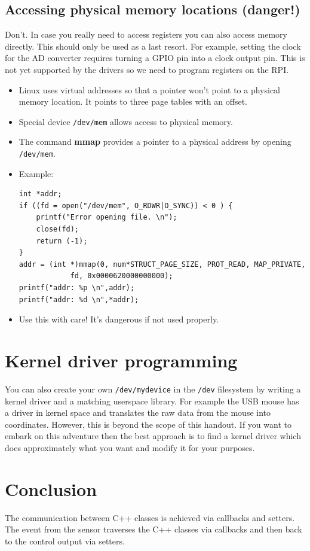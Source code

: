 \documentclass[12pt]{report}
\begin{document}
\subsection{Accessing physical memory locations (danger!)}
Don't.
In case you really need to access registers you can
also access memory directly. This should only be used as a last resort.
For example, setting the clock for the AD converter requires
turning a GPIO pin into a clock output pin. This is not yet
supported by the drivers so we need to program registers
on the RPI.
\begin{itemize}
\item Linux uses virtual addresses so that a pointer won't
point to a physical memory location. It points to three page
tables with an offset.
\item Special device \texttt{/dev/mem} allows access to physical
memory.
\item The command \textbf{mmap} provides a pointer to a physical
address by opening \texttt{/dev/mem}.
\item Example:
\begin{verbatim}
int *addr;
if ((fd = open("/dev/mem", O_RDWR|O_SYNC)) < 0 ) {
    printf("Error opening file. \n");
    close(fd);
    return (-1);
}
addr = (int *)mmap(0, num*STRUCT_PAGE_SIZE, PROT_READ, MAP_PRIVATE,
            fd, 0x0000620000000000);
printf("addr: %p \n",addr);
printf("addr: %d \n",*addr);
\end{verbatim}
\item Use this with care! It's dangerous if not used properly.
\end{itemize}


\section{Kernel driver programming}
You can also create your own \texttt{/dev/mydevice} in the \texttt{/dev} filesystem
by writing a kernel driver and a matching userspace library. For
example the USB mouse has a driver in kernel space and translates
the raw data from the mouse into coordinates. However,
this is beyond the scope of this handout. If you want to embark
on this adventure then the best approach is to
find a kernel driver which does approximately what you want and
modify it for your purposes.


\section{Conclusion}
The communication between C++ classes is achieved via
callbacks and setters. The event from the sensor traverses
the C++ classes via callbacks and then back to the control
output via setters.
\end{document}
